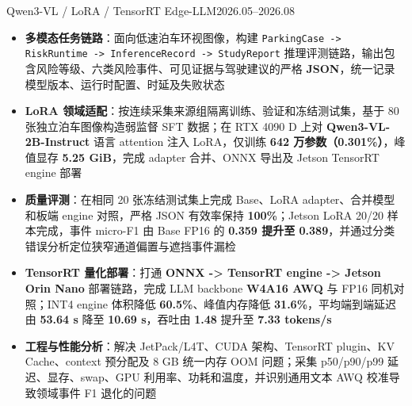 {Qwen3-VL / LoRA / TensorRT Edge-LLM}{2026.05--2026.08}
\begin{itemize}
  \item \textbf{多模态任务链路}：面向低速泊车环视图像，构建 \texttt{ParkingCase -> RiskRuntime -> InferenceRecord -> StudyReport} 推理评测链路，输出包含风险等级、六类风险事件、可见证据与驾驶建议的严格 \textbf{JSON}，统一记录模型版本、运行时配置、时延及失败状态
  \item \textbf{LoRA 领域适配}：按连续采集来源组隔离训练、验证和冻结测试集，基于 80 张独立泊车图像构造弱监督 SFT 数据；在 RTX 4090 D 上对 \textbf{Qwen3-VL-2B-Instruct} 语言 attention 注入 LoRA，仅训练 \textbf{642 万参数（0.301\%）}，峰值显存 \textbf{5.25 GiB}，完成 adapter 合并、ONNX 导出及 Jetson TensorRT engine 部署
  \item \textbf{质量评测}：在相同 20 张冻结测试集上完成 Base、LoRA adapter、合并模型和板端 engine 对照，严格 JSON 有效率保持 \textbf{100\%}；Jetson LoRA 20/20 样本完成，事件 micro-F1 由 Base FP16 的 \textbf{0.359 提升至 0.389}，并通过分类错误分析定位狭窄通道偏置与遮挡事件漏检
  \item \textbf{TensorRT 量化部署}：打通 \textbf{ONNX -> TensorRT engine -> Jetson Orin Nano} 部署链路，完成 LLM backbone \textbf{W4A16 AWQ} 与 FP16 同机对照；INT4 engine 体积降低 \textbf{60.5\%}、峰值内存降低 \textbf{31.6\%}，平均端到端延迟由 \textbf{53.64 s} 降至 \textbf{10.69 s}，吞吐由 \textbf{1.48} 提升至 \textbf{7.33 tokens/s}
  \item \textbf{工程与性能分析}：解决 JetPack/L4T、CUDA 架构、TensorRT plugin、KV Cache、context 预分配及 8 GB 统一内存 OOM 问题；采集 p50/p90/p99 延迟、显存、swap、GPU 利用率、功耗和温度，并识别通用文本 AWQ 校准导致领域事件 F1 退化的问题
\end{itemize}
